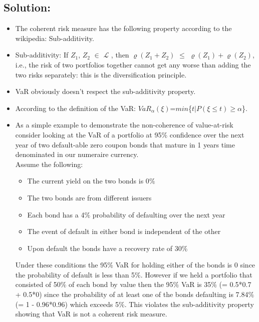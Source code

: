 \documentclass{article}
\theoremstyle{definition}
\theoremstyle{definition}
\theoremstyle{remark}
\begin{document}
\subsection*{Solution:}
\begin{itemize}
    \item The coherent risk measure has the following property 
according to the wikipedia: Sub-additivity.
    \item Sub-additivity: If $Z_1$, $Z_2$ $\in$ $\mathcal{L}$ ,
then $\varrho(Z_1 + Z_2)$ $\leq$ $\varrho(Z_1) + \varrho(Z_2)$, i.e., 
the risk of two portfolios together cannot get any worse than adding 
the two risks separately: this is the diversification principle.
    \item VaR obviously doesn't respect the sub-additivity property.
    \item According to the definition of the VaR: $VaR_{\alpha}(\xi)$=$min$\{$t$$|$$P(\xi \leq t)\geq \alpha$\}. 
    \item As a simple example to demonstrate the non-coherence of value-at-risk 
consider looking at the VaR of a portfolio at 95$\%$ 
confidence over the next year of two default-able zero coupon bonds that mature 
in 1 years time denominated in our numeraire currency. \\

    Assume the following:\\
    \begin{itemize}
        \item The current yield on the two bonds is 0$\%$
        \item The two bonds are from different issuers
        \item Each bond has a 4$\%$ probability of defaulting over the next year
        \item The event of default in either bond is independent of the other
        \item Upon default the bonds have a recovery rate of 30$\%$
    \end{itemize}
    Under these conditions the 95$\%$ VaR for holding either of the bonds 
        is 0 since the probability of default is less than 5$\%$. However if we held 
        a portfolio that consisted of 50$\%$ of each bond by value then the 95$\%$
        VaR is 35$\%$ (= 0.5*0.7 + 0.5*0) since the probability of at least one of 
        the bonds defaulting is 7.84$\%$ (= 1 - 0.96*0.96) which exceeds 5$\%$.
        This violates the sub-additivity property showing that VaR is not a coherent
        risk measure.
\end{itemize}
\end{document}
